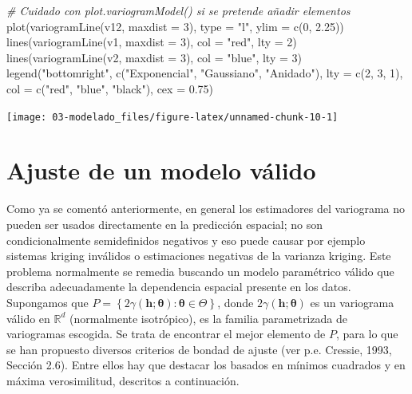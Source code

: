 \documentclass[
  spanish,
]{book}
\newenvironment{Shaded}{\begin{snugshade}}{\end{snugshade}}
\newcommand{\AttributeTok}[1]{\textcolor[rgb]{0.77,0.63,0.00}{#1}}
\newcommand{\CommentTok}[1]{\textcolor[rgb]{0.56,0.35,0.01}{\textit{#1}}}
\newcommand{\DecValTok}[1]{\textcolor[rgb]{0.00,0.00,0.81}{#1}}
\newcommand{\FloatTok}[1]{\textcolor[rgb]{0.00,0.00,0.81}{#1}}
\newcommand{\FunctionTok}[1]{\textcolor[rgb]{0.00,0.00,0.00}{#1}}
\newcommand{\NormalTok}[1]{#1}
\newcommand{\StringTok}[1]{\textcolor[rgb]{0.31,0.60,0.02}{#1}}
\theoremstyle{break}
\theoremstyle{definition}
\theoremstyle{definition}
\theoremstyle{definition}
\theoremstyle{definition}
\theoremstyle{remark}
\begin{document}
\begin{Shaded}
\begin{Highlighting}[]
\CommentTok{\# Cuidado con plot.variogramModel() si se pretende añadir elementos}
\FunctionTok{plot}\NormalTok{(}\FunctionTok{variogramLine}\NormalTok{(v12, }\AttributeTok{maxdist =} \DecValTok{3}\NormalTok{), }\AttributeTok{type =} \StringTok{"l"}\NormalTok{, }\AttributeTok{ylim =} \FunctionTok{c}\NormalTok{(}\DecValTok{0}\NormalTok{, }\FloatTok{2.25}\NormalTok{))}
\FunctionTok{lines}\NormalTok{(}\FunctionTok{variogramLine}\NormalTok{(v1, }\AttributeTok{maxdist =} \DecValTok{3}\NormalTok{), }\AttributeTok{col =} \StringTok{"red"}\NormalTok{, }\AttributeTok{lty =} \DecValTok{2}\NormalTok{)}
\FunctionTok{lines}\NormalTok{(}\FunctionTok{variogramLine}\NormalTok{(v2, }\AttributeTok{maxdist =} \DecValTok{3}\NormalTok{), }\AttributeTok{col =} \StringTok{"blue"}\NormalTok{, }\AttributeTok{lty =} \DecValTok{3}\NormalTok{)}
\FunctionTok{legend}\NormalTok{(}\StringTok{"bottomright"}\NormalTok{, }\FunctionTok{c}\NormalTok{(}\StringTok{"Exponencial"}\NormalTok{, }\StringTok{"Gaussiano"}\NormalTok{, }\StringTok{"Anidado"}\NormalTok{), }\AttributeTok{lty =} \FunctionTok{c}\NormalTok{(}\DecValTok{2}\NormalTok{, }\DecValTok{3}\NormalTok{, }\DecValTok{1}\NormalTok{), }
       \AttributeTok{col =} \FunctionTok{c}\NormalTok{(}\StringTok{"red"}\NormalTok{, }\StringTok{"blue"}\NormalTok{, }\StringTok{"black"}\NormalTok{), }\AttributeTok{cex =} \FloatTok{0.75}\NormalTok{)}
\end{Highlighting}
\end{Shaded}

\begin{center}\texttt{[image: 03-modelado\_files/figure-latex/unnamed-chunk-10-1]} \end{center}

\hypertarget{ajuste-variog}{%
\section{Ajuste de un modelo válido}\label{ajuste-variog}}

Como ya se comentó anteriormente, en general los estimadores del variograma no pueden ser usados directamente en la predicción espacial;
no son condicionalmente semidefinidos negativos y eso puede causar por ejemplo sistemas kriging inválidos o estimaciones negativas de la varianza kriging.
Este problema normalmente se remedia buscando un modelo paramétrico válido que describa adecuadamente la dependencia espacial presente en los datos.
Supongamos que \(P=\left\{ 2\gamma(\mathbf{h};\boldsymbol{\theta}):\boldsymbol{\theta}\in \Theta \right\}\), donde \(2\gamma(\mathbf{h};\boldsymbol{\theta})\) es un variograma válido en \(\mathbb{R}^{d}\) (normalmente isotrópico), es la familia parametrizada de variogramas escogida.
Se trata de encontrar el mejor elemento de \(P\), para lo que se han propuesto diversos criterios de bondad de ajuste (ver p.e. Cressie, 1993, Sección 2.6).
Entre ellos hay que destacar los basados en mínimos cuadrados y en máxima verosimilitud, descritos a continuación.
\end{document}
